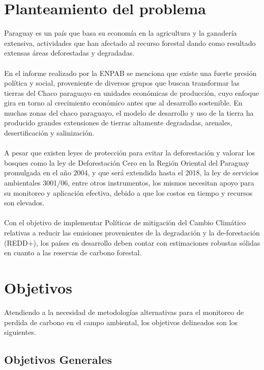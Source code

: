 \section{Planteamiento del problema}

Paraguay es un pa\'is que basa su econom\'ia en la agricultura y la ganader\'ia extensiva, actividades que han afectado al recurso forestal dando como resultado extensas \'areas deforestadas y degradadas.\\~\\
	En el informe realizado por la ENPAB \cite{basualdo2003estrategia} se menciona que existe una fuerte presi\'on pol\'itica y social, proveniente de diversos grupos que buscan transformar las tierras del Chaco paraguayo en unidades econ\'omicas de producci\'on, cuyo enfoque gira en torno al crecimiento econ\'omico antes que al desarrollo sostenible. 
	En muchas zonas del chaco paraguayo, el modelo de desarrollo y uso de la tierra ha producido grandes extensiones de tierras altamente degradadas, arenales, desertificaci\'on y salinizaci\'on.\\~\\	
	A pesar que existen leyes de protecci\'on para evitar la deforestaci\'on y valorar los bosques como la ley de Deforestaci\'on Cero en la Regi\'on Oriental del Paraguay promulgada en el a\~{n}o 2004, y que ser\'a extendida hasta el 2018, la ley de servicios ambientales 3001/06, entre otros instrumentos, los mismos necesitan apoyo para su monitoreo y aplicaci\'on efectiva, debido a que los costos en tiempo y recursos son elevados.\\~\\
	Con el objetivo de implementar Pol\'iticas de mitigaci\'on del Cambio Clim\'atico relativas a reducir las emisiones provenientes de la degradaci\'on y la de-forestaci\'on (REDD+), los pa\'ises en desarrollo deben contar con estimaciones robustas s\'olidas en cuanto a las reservas de carbono forestal\cite{BAAPA2013}.

\section{Objetivos}
Atendiendo a la necesidad de metodolog\'ias alternativas para el monitoreo de perdida de carbono en el campo ambiental, los objetivos delineados son los siguientes.

\subsection{Objetivos Generales}

